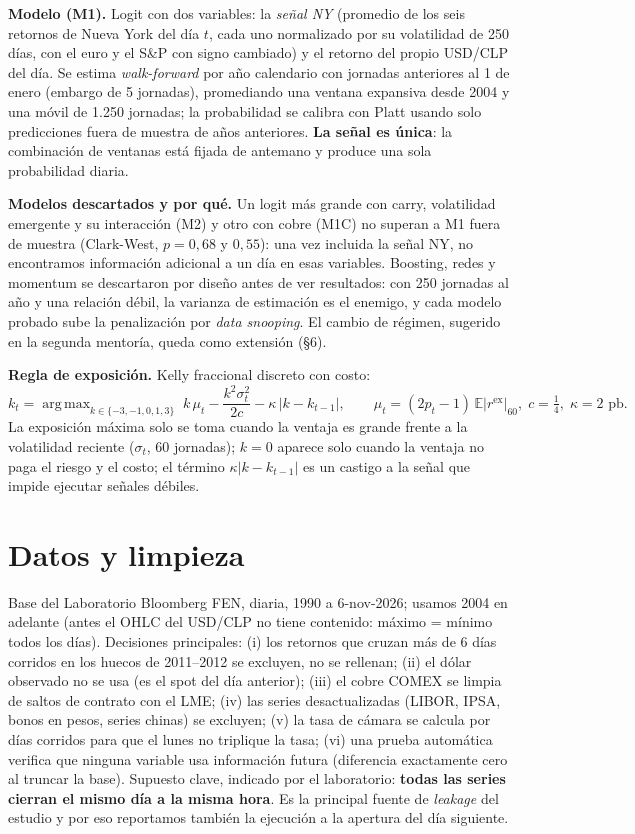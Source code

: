 \documentclass[11pt,a4paper]{article}
\newcommand{\rex}{r^{\text{ex}}}
\DeclareMathOperator*{\argmax}{arg\,max}
\begin{document}
\textbf{Modelo (M1).} Logit con dos variables: la \emph{señal NY} (promedio de los seis retornos de Nueva York del día $t$, cada uno normalizado por su volatilidad de 250 días, con el euro y el S\&P con signo cambiado) y el retorno del propio USD/CLP del día. Se estima \emph{walk-forward} por año calendario con jornadas anteriores al 1 de enero (embargo de 5 jornadas), promediando una ventana expansiva desde 2004 y una móvil de 1.250 jornadas; la probabilidad se calibra con Platt usando solo predicciones fuera de muestra de años anteriores. \textbf{La señal es única}: la combinación de ventanas está fijada de antemano y produce una sola probabilidad diaria.

\textbf{Modelos descartados y por qué.} Un logit más grande con carry, volatilidad emergente y su interacción (M2) y otro con cobre (M1C) no superan a M1 fuera de muestra (Clark-West, $p=0{,}68$ y $0{,}55$): una vez incluida la señal NY, no encontramos información adicional a un día en esas variables. Boosting, redes y momentum se descartaron por diseño antes de ver resultados: con 250 jornadas al año y una relación débil, la varianza de estimación es el enemigo, y cada modelo probado sube la penalización por \emph{data snooping}. El cambio de régimen, sugerido en la segunda mentoría, queda como extensión (\S6).

\textbf{Regla de exposición.} Kelly fraccional discreto con costo:
\[
k_t=\argmax_{k\in\{-3,-1,0,1,3\}}\; k\,\mu_t-\frac{k^2\sigma_t^2}{2c}-\kappa\,|k-k_{t-1}|,\qquad
\mu_t=(2p_t-1)\,\mathbb E|\rex|_{60},\; c=\tfrac14,\; \kappa=2\text{ pb}.
\]
La exposición máxima solo se toma cuando la ventaja es grande frente a la volatilidad reciente ($\sigma_t$, 60 jornadas); $k=0$ aparece solo cuando la ventaja no paga el riesgo y el costo; el término $\kappa|k-k_{t-1}|$ es un castigo a la señal que impide ejecutar señales débiles.

\section{Datos y limpieza}

Base del Laboratorio Bloomberg FEN, diaria, 1990 a 6-nov-2026; usamos 2004 en adelante (antes el OHLC del USD/CLP no tiene contenido: máximo = mínimo todos los días). Decisiones principales: (i) los retornos que cruzan más de 6 días corridos en los huecos de 2011--2012 se excluyen, no se rellenan; (ii) el dólar observado no se usa (es el spot del día anterior); (iii) el cobre COMEX se limpia de saltos de contrato con el LME; (iv) las series desactualizadas (LIBOR, IPSA, bonos en pesos, series chinas) se excluyen; (v) la tasa de cámara se calcula por días corridos para que el lunes no triplique la tasa; (vi) una prueba automática verifica que ninguna variable usa información futura (diferencia exactamente cero al truncar la base). Supuesto clave, indicado por el laboratorio: \textbf{todas las series cierran el mismo día a la misma hora}. Es la principal fuente de \emph{leakage} del estudio y por eso reportamos también la ejecución a la apertura del día siguiente.
\end{document}
